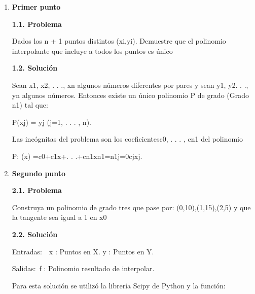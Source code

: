\documentclass[12pt]{article}
\renewcommand{\_}{\kern-1.5pt\textunderscore\kern-1.5pt}
\begin{document}
\vspace{\baselineskip}
\begin{enumerate}[label*={\fontsize{14pt}{14pt}\selectfont \textbf{\arabic*.}}]
	\item {\fontsize{14pt}{16.8pt}\selectfont \textbf{Primer punto}\par}\par

\textbf{1.1. Problema}\par

Dados los n + 1 puntos distintos (xi,yi). Demuestre que el polinomio interpolante que incluye a todos los puntos es único\par

\textbf{1.2. Solución}\par

Sean x1, x2, . . ., xn algunos números diferentes por pares y sean y1, y2. . ., yn algunos números. Entonces existe un único polinomio P de grado (Grado n1) tal que: \par

P(xj) = yj (j=1, . . . , n).\par

Las incógnitas del problema son los coeﬁcientesc0, . . . , cn1 del polinomio\par

P: (x) =c0+c1x+. . .+cn1xn1=n1j=0cjxj.\par


\vspace{\baselineskip}

\vspace{\baselineskip}
	\item {\fontsize{14pt}{16.8pt}\selectfont \textbf{Segundo punto}\par}\par

\textbf{2.1. Problema}\par

Construya un polinomio de grado tres que pase por: (0,10),(1,15),(2,5) y que la tangente sea igual a 1 en x0\par

\textbf{2.2. Solución}\par

Entradas:\ \  x : Puntos en X. y : Puntos en Y.\par

Salidas:\  f : Polinomio resultado de interpolar.\par

Para esta solución se utilizó la librería Scipy de Python y la función:\par


\end{enumerate}
\end{document}
